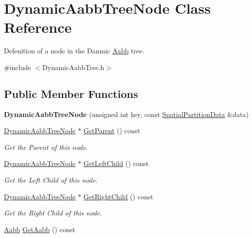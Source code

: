 \hypertarget{classDynamicAabbTreeNode}{}\section{Dynamic\+Aabb\+Tree\+Node Class Reference}
\label{classDynamicAabbTreeNode}


Defenition of a node in the Danmic \hyperlink{classAabb}{Aabb} tree.  




{\ttfamily \#include $<$Dynamic\+Aabb\+Tree.\+h$>$}

\subsection*{Public Member Functions}
\begin{DoxyCompactItemize}
\item 
\mbox{\label{classDynamicAabbTreeNode_a642f29ba18e5635f7c75ec00f4b0d8a1}} 
{\bfseries Dynamic\+Aabb\+Tree\+Node} (unsigned int key, const \hyperlink{classSpatialPartitionData}{Spatial\+Partition\+Data} \&data)
\item 
\hyperlink{classDynamicAabbTreeNode}{Dynamic\+Aabb\+Tree\+Node} $\ast$ \hyperlink{classDynamicAabbTreeNode_ad744f2b406abe153f6e4fc07f00d7b62}{Get\+Parent} () const
\begin{DoxyCompactList}\small\item\em Get the Parent of this node. \end{DoxyCompactList}\item 
\hyperlink{classDynamicAabbTreeNode}{Dynamic\+Aabb\+Tree\+Node} $\ast$ \hyperlink{classDynamicAabbTreeNode_a80c6ed32f3c5440f524ec38cdbf31a03}{Get\+Left\+Child} () const
\begin{DoxyCompactList}\small\item\em Get the Left Child of this node. \end{DoxyCompactList}\item 
\hyperlink{classDynamicAabbTreeNode}{Dynamic\+Aabb\+Tree\+Node} $\ast$ \hyperlink{classDynamicAabbTreeNode_a0a1ff4b73424133fcd437a19ac77a320}{Get\+Right\+Child} () const
\begin{DoxyCompactList}\small\item\em Get the Right Child of this node. \end{DoxyCompactList}\item 
\hyperlink{classAabb}{Aabb} \hyperlink{classDynamicAabbTreeNode_a63dd9923f939cd475b90568a949e9831}{Get\+Aabb} () const

\end{DoxyCompactItemize}
